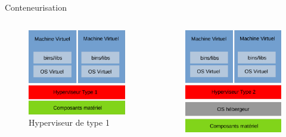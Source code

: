 \documentclass[11pt]{beamer}
\begin{document}
\begin{frame}{Conteneurisation}
\begin{columns}
    \begin{column}{0.33\textwidth}
        \begin{figure}
			\includegraphics[scale=0.20]{images/type1.png}
			\caption{Hyperviseur de type 1}
		\end{figure}
    \end{column}
    \begin{column}{0.33\textwidth}
        \begin{figure}
			\includegraphics[scale=0.20]{images/type2.png}

\end{figure}
\end{column}
\end{columns}
\end{frame}
\end{document}
